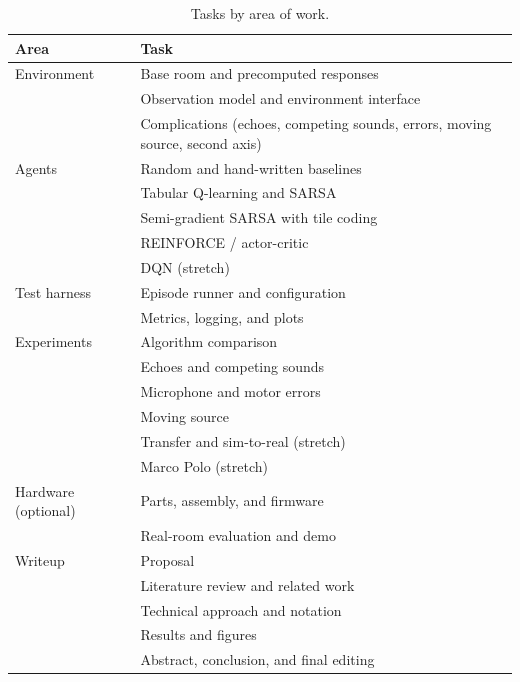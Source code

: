 \documentclass{article}
\begin{document}
\begin{table}[!htbp]
\centering
\small
\begin{tabular}{|>{\raggedright\arraybackslash}p{1.2in}|>{\raggedright\arraybackslash}p{2.9in}|}
\hline
\textbf{Area} & \textbf{Task} \\
\hline
Environment & Base room and precomputed responses \\
 & Observation model and environment interface \\
 & Complications (echoes, competing sounds, errors, moving source, second axis) \\
\hline
Agents & Random and hand-written baselines \\
 & Tabular Q-learning and SARSA \\
 & Semi-gradient SARSA with tile coding \\
 & REINFORCE / actor-critic \\
 & DQN (stretch) \\
\hline
Test harness & Episode runner and configuration \\
 & Metrics, logging, and plots \\
\hline
Experiments & Algorithm comparison \\
 & Echoes and competing sounds \\
 & Microphone and motor errors \\
 & Moving source \\
 & Transfer and sim-to-real (stretch) \\
 & Marco Polo (stretch) \\
\hline
Hardware (optional) & Parts, assembly, and firmware \\
 & Real-room evaluation and demo \\
\hline
Writeup & Proposal \\
 & Literature review and related work \\
 & Technical approach and notation \\
 & Results and figures \\
 & Abstract, conclusion, and final editing \\
\hline
\end{tabular}
\caption{Tasks by area of work.}
\label{tab:responsibilities}
\end{table}


\clearpage



\end{document}
